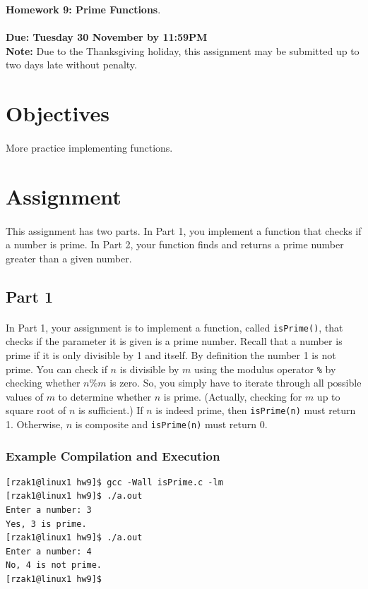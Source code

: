 \documentclass[letter,11pt]{article}
\begin{document}
\huge
\textbf{Homework 9: Prime Functions}.
\normalsize
\\ ~~ \\
\textbf{Due: Tuesday 30 November by 11:59PM} \\
\textbf{Note:} Due to the Thanksgiving holiday, this assignment may be submitted up to two days late without penalty.

\section*{Objectives}
\paragraph{}More practice implementing functions.

\section*{Assignment}
\paragraph{}This assignment has two parts. In Part 1, you implement a function that checks if a number is prime. In Part 2, your function finds and returns a prime number greater than a given number.

\subsection*{Part 1}
\paragraph{}In Part 1, your assignment is to implement a function, called \texttt{isPrime()}, that checks if the parameter it is given is a prime number. Recall that a number is prime if it is only divisible by 1 and itself. By definition the number 1 is not prime. You can check if $n$ is divisible by $m$ using the modulus operator \texttt{\%} by checking whether $n \% m$ is zero. So, you simply have to iterate through all possible values of $m$ to determine whether $n$ is prime. (Actually, checking for $m$ up to square root of $n$ is sufficient.) If $n$ is indeed prime, then \texttt{isPrime(n)} must return 1. Otherwise, $n$ is composite and \texttt{isPrime(n)} must return 0.

\subsubsection*{Example Compilation and Execution}
\begin{verbatim}
[rzak1@linux1 hw9]$ gcc -Wall isPrime.c -lm
[rzak1@linux1 hw9]$ ./a.out
Enter a number: 3
Yes, 3 is prime.
[rzak1@linux1 hw9]$ ./a.out
Enter a number: 4
No, 4 is not prime.
[rzak1@linux1 hw9]$
\end{verbatim}
\end{document}
